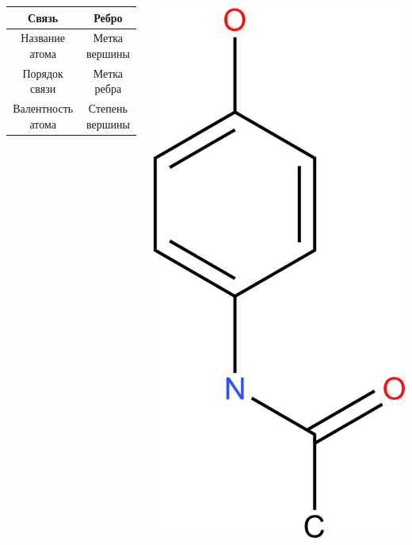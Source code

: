 \begin{frame}
\begin{columns}
\begin{column}{0.6\textwidth}
\begin{tabular}{|c|c|}
 {\color{magenta}Связь} & {\color{orange}Ребро} \\ \hline
      {\color{magenta}Название атома} & {\color{orange}Метка вершины} \\ \hline
      {\color{magenta}Порядок связи} & {\color{orange}Метка ребра} \\ \hline
      {\color{magenta}Валентность атома} & {\color{orange}Степень вершины} \\ \hline
      \end{tabular} \\
    \end{column}
    \begin{column}{0.2\textwidth}    
      \includegraphics[scale=0.3]{images/Diagram6.pdf}      

\end{column}
\end{columns}
\end{frame}
